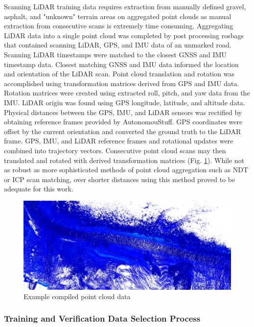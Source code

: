 \documentclass[numbered,pdftex]{ohio-etd}
\begin{document}
{{{{				{Scanning LiDAR training data requires extraction from manually defined gravel, asphalt, and "unknown" terrain areas on aggregated point clouds as manual extraction from consecutive scans is extremely time consuming. Aggregating LiDAR data into a single point cloud was completed by post processing rosbags that contained scanning LiDAR, GPS, and IMU data of an unmarked road. Scanning LiDAR timestamps were matched to the closest GNSS and IMU timestamp data. Closest matching GNSS and IMU data informed the location and orientation of the LiDAR scan. Point cloud translation and rotation was accomplished using transformation matrices derived from GPS and IMU data. Rotation matrices were created using extracted roll, pitch, and yaw data from the IMU. LiDAR origin was found using GPS longitude, latitude, and altitude data. Physical distances between the GPS, IMU, and LiDAR sensors was rectified by obtaining reference frames provided by AutonomouStuff. GPS coordinates were offset by the current orientation and converted the ground truth to the LiDAR frame. GPS, IMU, and LiDAR reference frames and rotational updates were combined into trajectory vectors. Consecutive point cloud scans may then translated and rotated with derived transformation matrices (Fig. \ref{fig:Compiled_PCD}). While not as robust as more sophisticated methods of point cloud aggregation such as NDT or ICP scan matching, over shorter distances using this method proved to be adequate for this work.} 
				
				\begin{figure}[H]
					\centering
					\includegraphics[width=0.7\linewidth]{Defense_Images/pc_example}
					\caption[Compiled Point Cloud Data]{Example compiled point cloud data}
					\label{fig:Compiled_PCD}
				\end{figure}
			
			} %
	
			\subsubsection{Training and Verification Data Selection Process}\label{sec:training_and_verification_data_selection_process}{

}}}}
\end{document}
